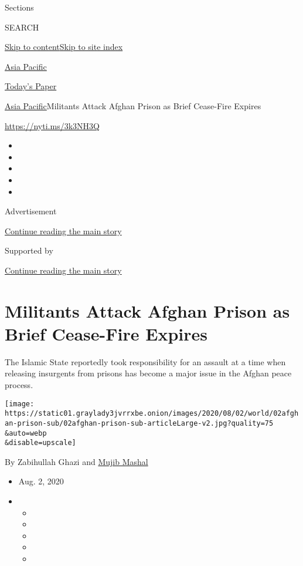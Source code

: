 Sections

SEARCH

\protect\hyperlink{site-content}{Skip to
content}\protect\hyperlink{site-index}{Skip to site index}

\href{https://www.nytimes3xbfgragh.onion/section/world/asia}{Asia
Pacific}

\href{https://myaccount.nytimes3xbfgragh.onion/auth/login?response_type=cookie\&client_id=vi}{}

\href{https://www.nytimes3xbfgragh.onion/section/todayspaper}{Today's
Paper}

\href{/section/world/asia}{Asia Pacific}\textbar{}Militants Attack
Afghan Prison as Brief Cease-Fire Expires

\url{https://nyti.ms/3k3NH3Q}

\begin{itemize}
\item
\item
\item
\item
\item
\end{itemize}

Advertisement

\protect\hyperlink{after-top}{Continue reading the main story}

Supported by

\protect\hyperlink{after-sponsor}{Continue reading the main story}

\hypertarget{militants-attack-afghan-prison-as-brief-cease-fire-expires}{%
\section{Militants Attack Afghan Prison as Brief Cease-Fire
Expires}\label{militants-attack-afghan-prison-as-brief-cease-fire-expires}}

The Islamic State reportedly took responsibility for an assault at a
time when releasing insurgents from prisons has become a major issue in
the Afghan peace process.

\texttt{[image: https://static01.graylady3jvrrxbe.onion/images/2020/08/02/world/02afghan-prison-sub/02afghan-prison-sub-articleLarge-v2.jpg?quality=75\\\&auto=webp\\\&disable=upscale]}

By Zabihullah Ghazi and
\href{https://www.nytimes3xbfgragh.onion/by/mujib-mashal}{Mujib Mashal}

\begin{itemize}
\item
  Aug. 2, 2020
\item
  \begin{itemize}
  \item
  \item
  \item
  \item
  \item
  \end{itemize}
\end{itemize}

